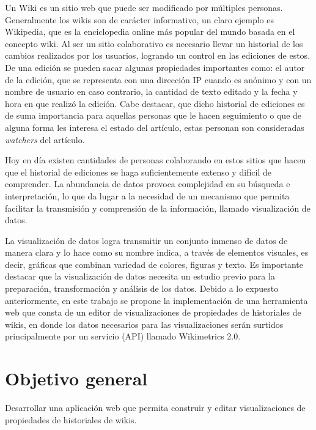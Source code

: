 Un Wiki es un sitio web que puede ser modificado por múltiples personas. Generalmente los wikis son de carácter informativo, un claro ejemplo es Wikipedia, que es la enciclopedia online más popular del mundo basada en el concepto wiki. Al ser un sitio colaborativo es necesario llevar un historial de los cambios realizados por los usuarios, logrando un control en las ediciones de estos. De una edición se pueden sacar algunas propiedades importantes como: el autor de la edición, que se representa con una dirección IP cuando es anónimo y con un nombre de usuario en caso contrario, la cantidad de texto editado y la fecha y hora en que realizó la edición. Cabe destacar, que dicho historial de ediciones es de suma importancia para aquellas personas que le hacen seguimiento o que de alguna forma les interesa el estado del artículo, estas personan son consideradas \textit{watchers} del artículo.

Hoy en día existen cantidades de personas colaborando en estos sitios que hacen que el historial de ediciones se haga suficientemente extenso y difícil de comprender. La abundancia de datos provoca complejidad en su búsqueda e interpretación, lo que da lugar a la necesidad de un mecanismo que permita facilitar la transmisión y comprensión de la información, llamado visualización de datos.

La visualización de datos logra transmitir un conjunto inmenso de datos de manera clara y lo hace como su nombre indica, a través de elementos visuales, es decir, gráficas que combinan variedad de colores, figuras y texto. Es importante destacar que la visualización de datos necesita un estudio previo para la preparación, transformación y análisis de los datos. Debido a lo expuesto anteriormente, en este trabajo se propone la implementación de una herramienta web que consta de un editor de visualizaciones de propiedades de historiales de wikis, en donde los datos necesarios para las visualizaciones serán surtidos principalmente por un servicio (API) llamado Wikimetrics 2.0. 

\section{Objetivo general}
Desarrollar una aplicación web que permita construir y editar visualizaciones de propiedades de historiales de wikis.

